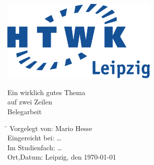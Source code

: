 \documentclass[12pt,a4paper]{scrartcl}
\begin{document}
	
	\ohead{\pagemark}
	\ihead{\sectionmark}
	\cfoot{}
	\pagestyle{scrheadings}
	\renewcommand{\sectionmark}[1]{\markright{#1}{}}
	
	\begin{titlepage}
		
		\begin{center}
			\includegraphics[height=4cm]{Bilder/HTWK_Logo_CMYK}
			
			\vspace*{3cm}
			
			{\LARGE Ein wirklich gutes Thema\\ auf zwei Zeilen}\\
			\vspace{1cm}
			{\Large Belegarbeit}\\
		\end{center}
		
		\vspace{8cm}
		
		\begin{tabbing}
			\hspace{4cm}\=\kill
			Vorgelegt von:		\> Mario Hesse \\
			Eingereicht bei:	\> \dots \\ 
			Im Studienfach:		\> \dots \\
			Ort,Datum:			\> Leipzig, den \today
		\end{tabbing} 
		
	\end{titlepage}
	
	
\end{document}
